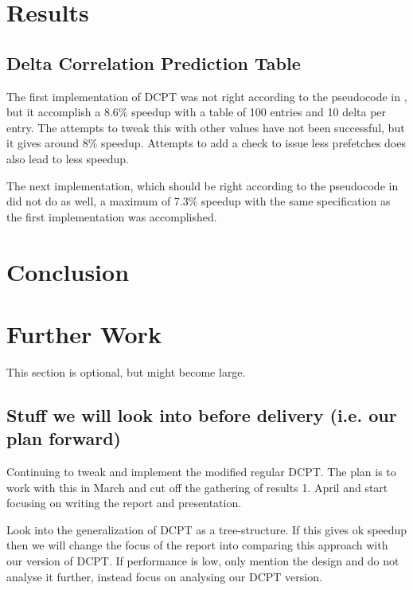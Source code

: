 \documentclass[12pt,journal,compsoc]{IEEEtran}
\begin{document}
\section{Results}
\subsection{Delta Correlation Prediction Table}
The first implementation of DCPT was not right according to the pseudocode in \cite{dcptpaper}, but it accomplish a 8.6\% speedup with a table of 100 entries and 10 delta per entry.
The attempts to tweak this with other values have not been successful, but it gives around 8\% speedup.
Attempts to add a check to issue less prefetches does also lead to less speedup.

The next implementation, which should be right according to the pseudocode in \cite{dcptpaper} did not do as well, a maximum of 7.3\% speedup with the same specification as the first implementation was accomplished.
\section{Conclusion}

\section{Further Work}
This section is optional, but might become large.

\subsection{Stuff we will look into before delivery (i.e. our plan forward)}
Continuing to tweak and implement the modified regular DCPT. The plan is
to work with this in March and cut off the gathering of results 1. April
and start focusing on writing the report and presentation.

Look into the generalization of DCPT as a tree-structure. If this gives
ok speedup then we will change the focus of the report into comparing this
approach with our version of DCPT. If performance is low, only mention the
design and do not analyse it further, instead focus on analysing our
DCPT version.
\end{document}
